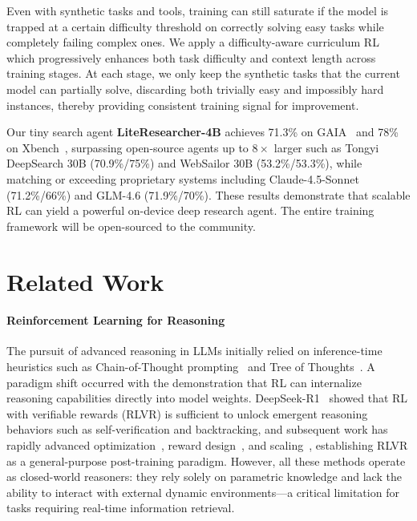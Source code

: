 \documentclass{article} %
\theoremstyle{plain}
\theoremstyle{definition}
\theoremstyle{remark}
\begin{document}
Even with synthetic tasks and tools, training can still saturate if the model is trapped at a certain difficulty threshold on correctly solving
easy tasks while completely failing complex ones. We apply a difficulty-aware curriculum RL which progressively enhances both task difficulty and context length across training stages. At each stage, we only keep the synthetic tasks that the current model can partially solve, discarding both trivially easy and impossibly hard instances, thereby providing consistent training signal for improvement.

Our tiny search agent \textbf{LiteResearcher-4B} achieves 71.3\% on GAIA~\citep{mialon2023gaia} and 78\% on Xbench~\citep{chen2025xbench}, surpassing open-source agents up to $8\times$ larger such as Tongyi DeepSearch 30B (70.9\%/75\%) and WebSailor 30B (53.2\%/53.3\%), while matching or exceeding proprietary systems including Claude-4.5-Sonnet (71.2\%/66\%) and GLM-4.6 (71.9\%/70\%). These results demonstrate that scalable RL can yield a powerful on-device deep research agent. The entire training framework will be open-sourced to the community.

\section{Related Work}

\paragraph{Reinforcement Learning for Reasoning}
The pursuit of advanced reasoning in LLMs initially relied on inference-time heuristics such as Chain-of-Thought prompting~\citep{wei2022chain} and Tree of Thoughts~\citep{yao2023tree}. A paradigm shift occurred with the demonstration that RL can internalize reasoning capabilities directly into model weights. DeepSeek-R1~\citep{guo2025deepseek} showed that RL with verifiable rewards (RLVR) is sufficient to unlock emergent reasoning behaviors such as self-verification and backtracking, and subsequent work has rapidly advanced optimization~\citep{yu2025dapo,liu2025prorl}, reward design~\citep{cui2025process}, and scaling~\citep{hu2025open,yang2025qwen3}, establishing RLVR as a general-purpose post-training paradigm. However, all these methods operate as closed-world reasoners: they rely solely on parametric knowledge and lack the ability to interact with external dynamic environments---a critical limitation for tasks requiring real-time information retrieval.
\end{document}
